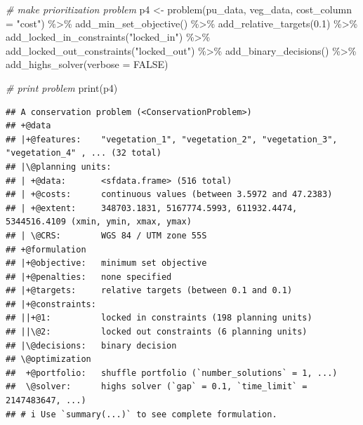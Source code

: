 \documentclass[
  12pt,
]{book}
\newenvironment{Shaded}{\begin{snugshade}}{\end{snugshade}}
\newcommand{\AttributeTok}[1]{\textcolor[rgb]{0.77,0.63,0.00}{#1}}
\newcommand{\CommentTok}[1]{\textcolor[rgb]{0.56,0.35,0.01}{\textit{#1}}}
\newcommand{\ConstantTok}[1]{\textcolor[rgb]{0.00,0.00,0.00}{#1}}
\newcommand{\FloatTok}[1]{\textcolor[rgb]{0.00,0.00,0.81}{#1}}
\newcommand{\FunctionTok}[1]{\textcolor[rgb]{0.00,0.00,0.00}{#1}}
\newcommand{\NormalTok}[1]{#1}
\newcommand{\OtherTok}[1]{\textcolor[rgb]{0.56,0.35,0.01}{#1}}
\newcommand{\SpecialCharTok}[1]{\textcolor[rgb]{0.00,0.00,0.00}{#1}}
\newcommand{\StringTok}[1]{\textcolor[rgb]{0.31,0.60,0.02}{#1}}
\begin{document}
\begin{Shaded}
\begin{Highlighting}[]
\CommentTok{\# make prioritization problem}
\NormalTok{p4 }\OtherTok{\textless{}{-}} \FunctionTok{problem}\NormalTok{(pu\_data, veg\_data, }\AttributeTok{cost\_column =} \StringTok{"cost"}\NormalTok{) }\SpecialCharTok{\%\textgreater{}\%}
      \FunctionTok{add\_min\_set\_objective}\NormalTok{() }\SpecialCharTok{\%\textgreater{}\%}
      \FunctionTok{add\_relative\_targets}\NormalTok{(}\FloatTok{0.1}\NormalTok{) }\SpecialCharTok{\%\textgreater{}\%}
      \FunctionTok{add\_locked\_in\_constraints}\NormalTok{(}\StringTok{"locked\_in"}\NormalTok{) }\SpecialCharTok{\%\textgreater{}\%}
      \FunctionTok{add\_locked\_out\_constraints}\NormalTok{(}\StringTok{"locked\_out"}\NormalTok{) }\SpecialCharTok{\%\textgreater{}\%}
      \FunctionTok{add\_binary\_decisions}\NormalTok{() }\SpecialCharTok{\%\textgreater{}\%}
      \FunctionTok{add\_highs\_solver}\NormalTok{(}\AttributeTok{verbose =} \ConstantTok{FALSE}\NormalTok{)}
\end{Highlighting}
\end{Shaded}

\begin{Shaded}
\begin{Highlighting}[]
\CommentTok{\# print problem}
\FunctionTok{print}\NormalTok{(p4)}
\end{Highlighting}
\end{Shaded}

\begin{verbatim}
## A conservation problem (<ConservationProblem>)
## +@data
## |+@features:    "vegetation_1", "vegetation_2", "vegetation_3", "vegetation_4" , ... (32 total)
## |\@planning units:
## | +@data:       <sfdata.frame> (516 total)
## | +@costs:      continuous values (between 3.5972 and 47.2383)
## | +@extent:     348703.1831, 5167774.5993, 611932.4474, 5344516.4109 (xmin, ymin, xmax, ymax)
## | \@CRS:        WGS 84 / UTM zone 55S
## +@formulation
## |+@objective:   minimum set objective
## |+@penalties:   none specified
## |+@targets:     relative targets (between 0.1 and 0.1)
## |+@constraints:
## ||+@1:          locked in constraints (198 planning units)
## ||\@2:          locked out constraints (6 planning units)
## |\@decisions:   binary decision
## \@optimization
##  +@portfolio:   shuffle portfolio (`number_solutions` = 1, ...)
##  \@solver:      highs solver (`gap` = 0.1, `time_limit` = 2147483647, ...)
## # i Use `summary(...)` to see complete formulation.
\end{verbatim}
\end{document}
